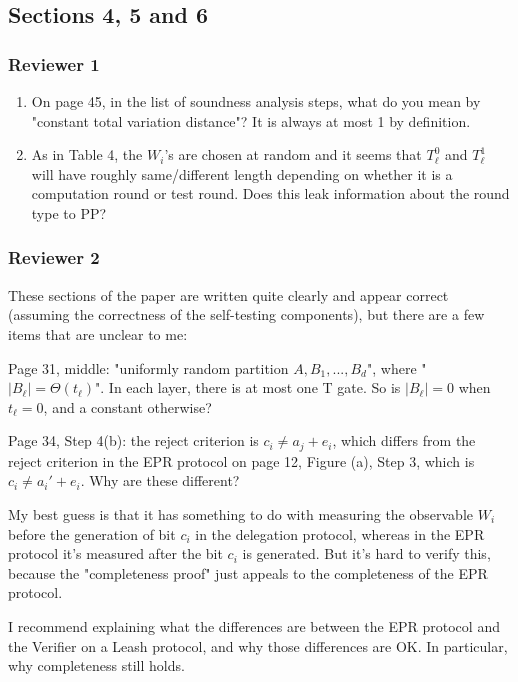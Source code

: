 \documentclass[12pt]{article}
\begin{document}
\begin{enumerate}
\end{enumerate}


\subsection*{Sections 4, 5 and 6}
\subsubsection*{Reviewer 1}
\begin{enumerate}
\item On page 45, in the list of soundness analysis steps, what do you mean by "constant total variation distance"? It is always at most 1 by definition.
\item As in Table 4, the $W_i$'s are chosen at random and it seems that $T^0_\ell$ and $T^1_\ell$ will have roughly same/different length depending on whether it is a computation round or test round. Does this leak information about the round type to PP?

\end{enumerate}

\subsubsection*{Reviewer 2}

These sections of the paper are written quite clearly and appear correct (assuming the correctness of the self-testing components), but there are a few items that are unclear to me:

Page 31, middle: "uniformly random partition $A, B_1,..., B_d$", where "$|B_\ell| = \Theta(t_\ell)$". In each layer, there is at most one T gate. So is $|B_\ell| = 0$ when $t_\ell = 0$, and a constant otherwise?

Page 34, Step 4(b): the reject criterion is $c_i \neq a_j + e_i$, which differs from the reject criterion in the EPR protocol on page 12, Figure (a), Step 3, which is $c_i \neq a_i' + e_i$. Why are these different?

My best guess is that it has something to do with measuring the observable $W_i$ before the generation of bit $c_i$ in the delegation protocol, whereas in the EPR protocol it's measured after the bit $c_i$ is generated. But it's hard to verify this, because the "completeness proof" just appeals to the completeness of the EPR protocol.

I recommend explaining what the differences are between the EPR protocol and the Verifier on a Leash protocol, and why those differences are OK. In particular, why completeness still holds.
\end{document}
